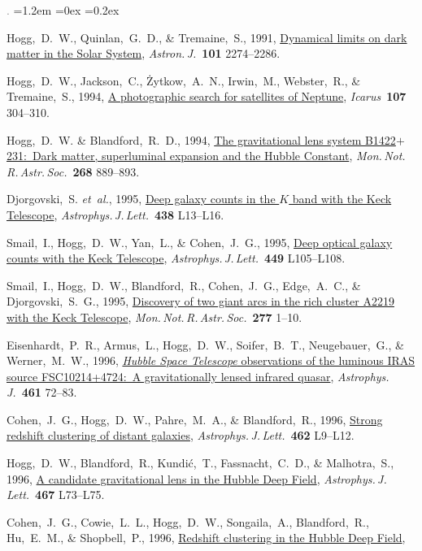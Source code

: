 \documentclass[10pt,letterpaper]{article}
\newcommand{\foreign}[1]{\textsl{#1}}
\newcommand{\etal}{\foreign{et~al.}}
\newcommand{\project}[1]{\textsl{#1}}
\newcommand{\doi}[2]{\href{http://dx.doi.org/#1}{{#2}}}
\newcommand{\ads}[2]{\href{http://adsabs.harvard.edu/abs/#1}{{#2}}}
\newcommand{\deemph}[1]{\textcolor{grey}{\footnotesize{#1}}}
\newcommand{\pubnumber}[1]{\deemph{{#1}.}}
\newcounter{refpubnum}
\newcommand{\hogglist}{%
    \rightmargin=0in
    \leftmargin=1.2em
    \topsep=0ex
    \partopsep=0pt
    \itemsep=0.2ex
    \parsep=0pt
    \itemindent=-1.0\leftmargin
    \listparindent=0.0\leftmargin
    \settowidth{\labelsep}{~}
    \usecounter{refpubnum}
  }
\begin{document}
\begin{list}{\pubnumber{\therefpubnum}}{\hogglist}
\item
Hogg,~D.~W., Quinlan,~G.~D., \& Tremaine,~S., 1991,
\doi{10.1086/115849}{Dynamical limits on dark matter in the Solar System},
\textit{Astron.\,J.}\ \textbf{101} 2274--2286.
\item
Hogg,~D.~W., Jackson,~C., \.Zytkow,~A.~N., Irwin,~M., Webster,~R., \& Tremaine,~S., 1994,
\doi{10.1006/icar.1994.1025}{A photographic search for satellites of Neptune},
\textit{Icarus}\ \textbf{107} 304--310.
\item
Hogg,~D.~W. \& Blandford,~R.~D., 1994,
\ads{1994MNRAS.268..889H}{The gravitational lens system B1422$+$231:\ Dark matter, superluminal expansion and the Hubble Constant},
\textit{Mon.\,Not.\,R.\,Astr.\,Soc.}\ \textbf{268} 889--893.
\item
Djorgovski,~S. \etal, 1995,
\doi{10.1086/187703}{Deep galaxy counts in the $K$ band with the Keck Telescope},
\textit{Astrophys.\,J.\,Lett.}\ \textbf{438} L13--L16.
\item
Smail,~I., Hogg,~D.~W., Yan,~L., \& Cohen,~J.~G., 1995,
\doi{10.1086/309647}{Deep optical galaxy counts with the Keck Telescope},
\textit{Astrophys.\,J.\,Lett.}\ \textbf{449} L105--L108.
\item
Smail,~I., Hogg,~D.~W., Blandford,~R., Cohen,~J.~G., Edge,~A.~C., \& Djorgovski,~S.~G., 1995,
\ads{1995MNRAS.277....1S}{Discovery of two giant arcs in the rich cluster A2219 with the Keck Telescope},
\textit{Mon.\,Not.\,R.\,Astr.\,Soc.}\ \textbf{277} 1--10.
\item
Eisenhardt,~P.~R., Armus,~L., Hogg,~D.~W., Soifer,~B.~T., Neugebauer,~G., \& Werner,~M.~W., 1996,
\doi{10.1086/177038}{\project{Hubble Space Telescope} observations of the luminous IRAS source FSC10214+4724:\ A gravitationally lensed infrared quasar},
\textit{Astrophys.\,J.}\ \textbf{461} 72--83.
\item
Cohen,~J.~G., Hogg,~D.~W., Pahre,~M.~A., \& Blandford,~R., 1996,
\doi{10.1086/310020}{Strong redshift clustering of distant galaxies},
\textit{Astrophys.\,J.\,Lett.}\ \textbf{462} L9--L12.
\item
Hogg,~D.~W., Blandford,~R., Kundi\'c,~T., Fassnacht,~C.~D., \& Malhotra,~S., 1996,
\doi{10.1086/310213}{A candidate gravitational lens in the Hubble Deep Field},
\textit{Astrophys.\,J.\,Lett.}\ \textbf{467} L73--L75.
\item
Cohen,~J.~G., Cowie,~L.~L., Hogg,~D.~W., Songaila,~A., Blandford,~R.,
Hu,~E.~M., \& Shopbell,~P., 1996,
\doi{10.1086/310330}{Redshift clustering in the Hubble Deep Field},

\end{list}
\end{document}

